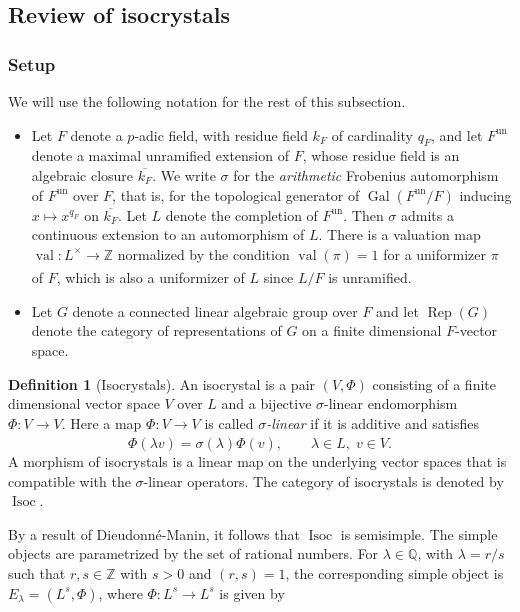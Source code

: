 \documentclass[11pt,a4paper]{article}
\theoremstyle{definition}
\newtheorem{D}[shared]{Definition}
\theoremstyle{plain}
\theoremstyle{remark}
\theoremstyle{plain}
\DeclareMathOperator{\Isoc}{Isoc}
\DeclareMathOperator{\Rep}{Rep}
\DeclareMathOperator{\val}{val}
\DeclareMathOperator{\Gal}{Gal}
\begin{document}
\subsection{Review of isocrystals}\label{2.1}
\subsubsection{Setup}
We will use the following notation for the rest of this subsection.
\begin{itemize}
    \item Let $F$ denote a $p$-adic field, with residue field $k_F$ of cardinality $q_F$, and let $F^{\text{un}}$ denote a maximal unramified extension of $F$, whose residue field is an algebraic closure $\overline{k_F}$. We write $\sigma$ for the \textit{arithmetic} Frobenius automorphism of $F^{\text{un}}$ over $F$, that is, for the topological generator of $\Gal(F^{\text{un}}/F)$ inducing $x \mapsto x^{q_F}$ on $\overline{k_F}$. Let $L$ denote the completion of $F^{\text{un}}$. Then $\sigma$ admits a continuous extension to an automorphism of $L$. There is a valuation map $\val: L^{\times} \xrightarrow[]{} \mathbb{Z}$ normalized by the condition $\val(\pi) = 1$ for a uniformizer $\pi$ of $F$, which is also a uniformizer of $L$ since $L/F$ is unramified.
    \item Let $G$ denote a connected linear algebraic group over $F$ and let $\Rep(G)$ denote the category of representations of $G$ on a finite dimensional $F$-vector space. 
\end{itemize}

\begin{D}[Isocrystals] 
    An isocrystal is a pair $(V,\Phi)$ consisting of a finite dimensional vector space $V$ over $L$ and a bijective $\sigma$-linear endomorphism $\Phi: V \xrightarrow[]{} V$. Here a map $\Phi: V \xrightarrow[]{} V$ is called \textit{$\sigma$-linear} if it is additive and satisfies
    $$\Phi(\lambda v)=\sigma(\lambda)\Phi(v), \qquad \lambda\in L,\; v\in V.$$ A morphism of isocrystals is a linear map on the underlying vector spaces that is compatible with the $\sigma$-linear operators. The category of isocrystals is denoted by $\Isoc$.
\end{D}

By a result of Dieudonné-Manin, it follows that $\Isoc$ is semisimple. The simple objects are parametrized by the set of rational numbers. For $\lambda \in \mathbb{Q}$, with $\lambda = r/s$ such that $r,s \in \mathbb{Z}$ with $s > 0$ and $(r,s) = 1$, the corresponding simple object is $E_{\lambda} = (L^s, \Phi)$, where $\Phi: L^s \xrightarrow[]{} L^s$ is given by
\end{document}
